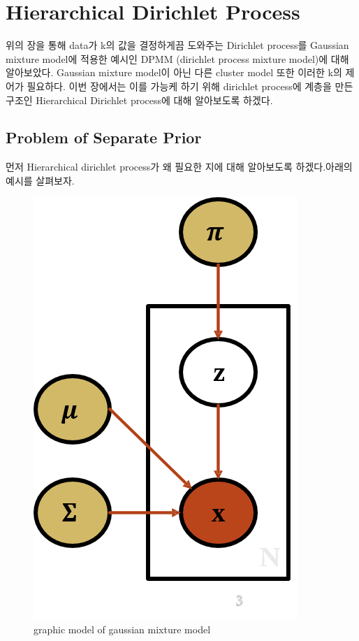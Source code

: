 \documentclass[a4paper]{oblivoir}
\begin{document}
\section{Hierarchical Dirichlet Process}
위의 장을 통해 data가 k의 값을 결정하게끔 도와주는 Dirichlet process를 Gaussian mixture model에 적용한 예시인 DPMM (dirichlet process mixture model)에 대해 알아보았다. Gaussian mixture model이 아닌 다른 cluster model 또한 이러한 k의 제어가 필요하다. 이번 장에서는 이를 가능케 하기 위해 dirichlet process에 계층을 만든 구조인 Hierarchical Dirichlet process에 대해 알아보도록 하겠다. 

\subsection{Problem of Separate Prior}
먼저 Hierarchical dirichlet process가 왜 필요한 지에 대해 알아보도록 하겠다.아래의 예시를 살펴보자. 
\begin{figure}[ht] \centering 
\begin{center}
\includegraphics[scale=0.6]{fig13_1.png} 
\caption{graphic model of gaussian mixture model}
\label{fig:13-10}
\end{center}
\end{figure}
\end{document}
